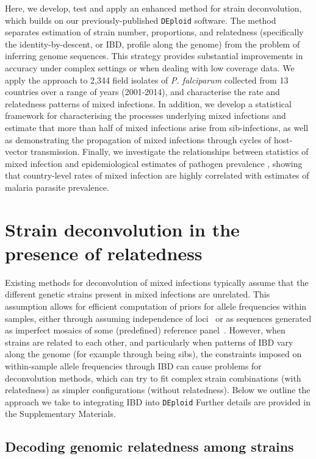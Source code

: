 \documentclass[9pt,lineno]{elife}
\begin{document}
Here, we develop, test and apply an enhanced method for strain deconvolution, which builds on our previously-published \texttt{DEploid} software.  The method separates estimation of strain number, proportions, and relatedness (specifically the identity-by-descent, or IBD, profile along the genome) from the problem of inferring genome sequences. This strategy provides substantial improvements in accuracy under complex settings or when dealing with low coverage data.  We apply the approach to 2,344 field isolates of {\it P. falciparum} collected from 13 countries over a range of years (2001-2014), and characterise the rate and relatedness patterns of mixed infections.  In addition, we develop a statistical framework for characterising the processes underlying mixed infections and estimate that more than half of mixed infections arise from sib-infections, as well as demonstrating the propagation of mixed infections through cycles of host-vector transmission.  Finally, we investigate the relationships between statistics of mixed infection and epidemiological estimates of pathogen prevalence \citep{MAP2017}, showing that country-level rates of mixed infection are highly correlated with estimates of malaria parasite prevalence.

\section{Strain deconvolution in the presence of relatedness}

Existing methods for deconvolution of mixed infections typically assume that the different genetic strains present in mixed infections are unrelated.  This assumption allows for efficient computation of priors for allele frequencies within samples, either through assuming independence of loci~\citep{Jack2016} or as sequences generated as imperfect mosaics of some (predefined) reference panel~\citep{Zhu2017}.  However, when strains are related to each other, and particularly when patterns of IBD vary along the genome (for example through being sibs), the constraints imposed on within-sample allele frequencies through IBD can cause problems for deconvolution methods, which can try to fit complex strain combinations (with relatedness) as simpler configurations (without relatedness).  Below we outline the approach we take to integrating IBD into \texttt{DEploid}  Further details are provided in the Supplementary Materials.


\subsection{Decoding genomic relatedness among strains}
\end{document}
